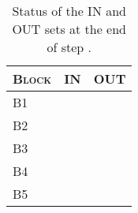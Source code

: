 \begin{table}[H]
\centering
\begin{tabular}{lcc}
	\toprule
	\textsc{Block}	& \textsc{IN}	& \textsc{OUT} \\
	\midrule
	B1	& \INBone	& \OUTBone	\\
	B2	& \INBtwo	& \OUTBtwo	\\
	B3	& \INBthree	& \OUTBthree\\
	B4	& \INBfour	& \OUTBfour	\\
	B5	& \INBfive	& \OUTBfive	\\
\end{tabular}
\caption{Status of the IN and OUT sets at the end of step .}
\label{tab:3-b-\arabic{subsubsection}} %
\end{table}
